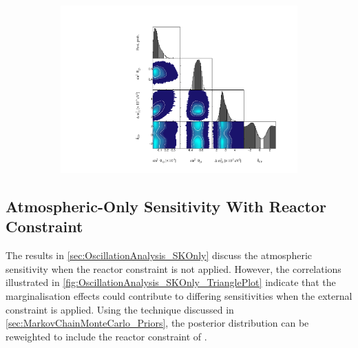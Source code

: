 \begin{figure}[h]
  \begin{subfigure}[t]{1.0\textwidth}
    \includegraphics[width=\textwidth, trim={0mm 0mm 0mm 0mm}, clip,page=1]{Figures/OA/SKOnlyFit/Contours_1D_woRC_UnSmeared_CredibleInterval_TrianglePlot.pdf}
  \end{subfigure}
  \caption{}
  \label{fig:OscillationAnalysis_SKOnly_TrianglePlot}
\end{figure}

\clearpage
\subsection{Atmospheric-Only Sensitivity With Reactor Constraint}
\label{sec:OscillationAnalysis_SKOnly_wRC}

The results in \autoref{sec:OscillationAnalysis_SKOnly} discuss the atmospheric sensitivity when the reactor constraint is not applied. However, the correlations illustrated in \autoref{fig:OscillationAnalysis_SKOnly_TrianglePlot} indicate that the marginalisation effects could contribute to differing sensitivities when the external constraint is applied. Using the technique discussed in \autoref{sec:MarkovChainMonteCarlo_Priors}, the posterior distribution can be reweighted to include the reactor constraint of .

